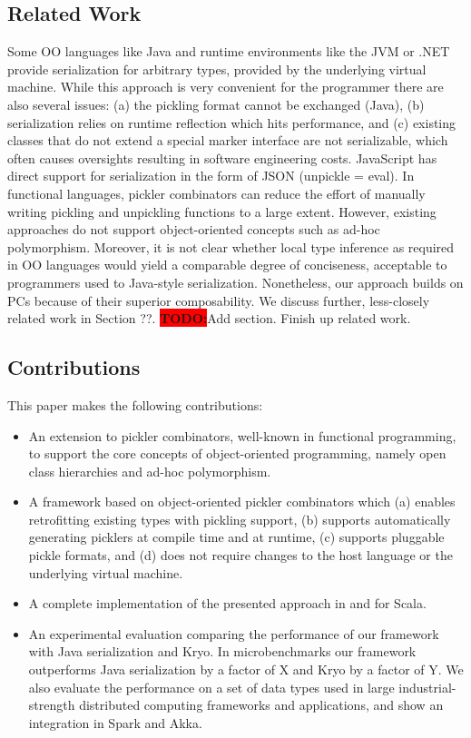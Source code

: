 \documentclass[preprint,10pt]{sigplanconf}
\newcommand{\todo}{{\bf \colorbox{red}{\color{white}TODO:}}}
\begin{document}
\subsection{Related Work}

Some OO languages like Java and runtime environments like the JVM or .NET
provide serialization for arbitrary types, provided by the underlying virtual
machine. While this approach is very convenient for the programmer there are
also several issues: (a) the pickling format cannot be exchanged (Java), (b)
serialization relies on runtime reflection which hits performance, and (c)
existing classes that do not extend a special marker interface are not
serializable, which often causes oversights resulting in software engineering
costs. JavaScript has direct support for serialization in the form of JSON
(unpickle = eval). In functional languages, pickler combinators can reduce the
effort of manually writing pickling and unpickling functions to a large
extent. However, existing approaches do not support object-oriented concepts
such as ad-hoc polymorphism. Moreover, it is not clear whether local type
inference as required in OO languages would yield a comparable degree of
conciseness, acceptable to programmers used to Java-style serialization.
Nonetheless, our approach builds on PCs because of their superior
composability. We discuss further, less-closely related work in Section ??.
\todo Add section. Finish up related work.

\subsection{Contributions}

This paper makes the following contributions:

\begin{itemize}

\item An extension to pickler combinators, well-known in functional
programming,  to support the core concepts of object-oriented programming,
namely open class hierarchies and ad-hoc polymorphism.

\item A framework based on object-oriented pickler combinators which (a)
enables retrofitting existing types with pickling support, (b) supports
automatically generating picklers at compile time and at runtime, (c) supports
pluggable pickle formats, and (d) does not require changes to the host
language or the underlying virtual machine.

\item A complete implementation of the presented approach in and for Scala.

\item An experimental evaluation comparing the performance of our framework
with Java serialization and Kryo. In microbenchmarks our framework outperforms
Java serialization by a factor of X and Kryo by a factor of Y. We also
evaluate the performance on a set of data types used in large industrial-
strength distributed computing frameworks and applications, and show an
integration in Spark and Akka.

\end{itemize}
\end{document}
